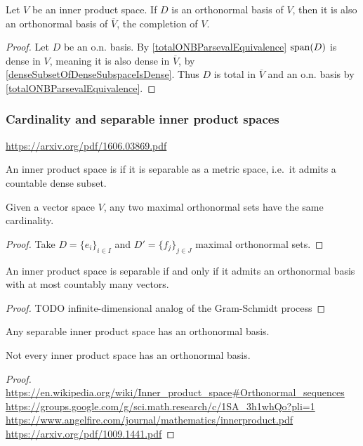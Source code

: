 \begin{lemma}
Let $V$ be an inner product space. If $D$ is an orthonormal basis of $V$, then it is also an orthonormal basis of $\overline{V}$, the completion of $V$.
\end{lemma}
\begin{proof}
Let $D$ be an o.n. basis. By \ref{totalONBParsevalEquivalence} $\operatorname{span}(D)$ is dense in $V$, meaning it is also dense in $\overline{V}$, by \ref{denseSubsetOfDenseSubspaceIsDense}. Thus $D$ is total in $\overline{V}$ and an o.n. basis by \ref{totalONBParsevalEquivalence}.
\end{proof}

\subsubsection{Cardinality and separable inner product spaces}
\url{https://arxiv.org/pdf/1606.03869.pdf}
\begin{definition}
An inner product space is  if it is separable as a metric space, i.e.\ it admits a countable dense subset.
\end{definition}

\begin{proposition}
Given a vector space $V$, any two maximal orthonormal sets have the same cardinality.
\end{proposition}
\begin{proof}
Take $D = \{e_i\}_{i\in I}$ and $D' = \{f_j\}_{j\in J}$ maximal orthonormal sets.
\end{proof}

\begin{proposition}
An inner product space is separable \textup{if and only if} it admits an orthonormal basis with at most countably many vectors.
\end{proposition}
\begin{proof}
TODO infinite-dimensional analog of the Gram-Schmidt process
\end{proof}
\begin{corollary}
Any separable inner product space has an orthonormal basis.
\end{corollary}

\begin{proposition}
Not every inner product space has an orthonormal basis.
\end{proposition}
\begin{proof}
\url{https://en.wikipedia.org/wiki/Inner_product_space#Orthonormal_sequences}
\url{https://groups.google.com/g/sci.math.research/c/1SA_3h1whQo?pli=1}
\url{https://www.angelfire.com/journal/mathematics/innerproduct.pdf}
\url{https://arxiv.org/pdf/1009.1441.pdf}
\end{proof}


